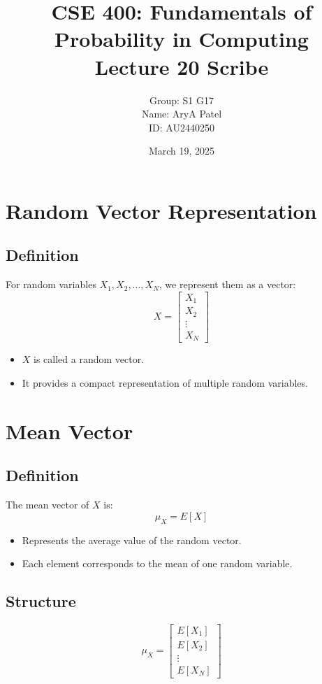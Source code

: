 \documentclass[11pt]{article}
\title{CSE 400: Fundamentals of Probability in Computing\\
Lecture 20 Scribe}
\author{Group: S1 G17 \\ Name: AryA Patel \\ ID: AU2440250}
\date{March 19, 2025}
\begin{document}
\maketitle

\section{Random Vector Representation}

\subsection{Definition}
For random variables $X_1, X_2, \dots, X_N$, we represent them as a vector:
\[
X =
\begin{bmatrix}
X_1 \\
X_2 \\
\vdots \\
X_N
\end{bmatrix}
\]

\begin{itemize}
\item $X$ is called a random vector.
\item It provides a compact representation of multiple random variables.
\end{itemize}

\section{Mean Vector}

\subsection{Definition}
The mean vector of $X$ is:
\[
\mu_X = E[X]
\]

\begin{itemize}
\item Represents the average value of the random vector.
\item Each element corresponds to the mean of one random variable.
\end{itemize}

\subsection{Structure}
\[
\mu_X =
\begin{bmatrix}
E[X_1] \\
E[X_2] \\
\vdots \\
E[X_N]
\end{bmatrix}
\]
\end{document}

